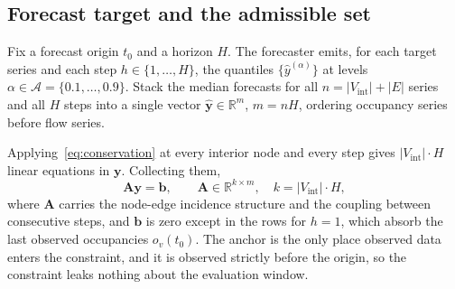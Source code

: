 \documentclass[11pt]{article}
\theoremstyle{plain}
\theoremstyle{definition}
\theoremstyle{remark}
\newcommand{\bA}{\bm{A}}
\newcommand{\by}{\bm{y}}
\newcommand{\bb}{\bm{b}}
\newcommand{\yhat}{\hat{\by}}
\newcommand{\Rb}{\mathbb{R}}
\begin{document}
\subsection{Forecast target and the admissible set}

Fix a forecast origin $t_0$ and a horizon $H$. The forecaster emits, for each target series and each step $h \in \{1,\dots,H\}$, the quantiles $\{\hat{y}^{(\alpha)}\}$ at levels $\alpha \in \mathcal{A} = \{0.1,\dots,0.9\}$. Stack the median forecasts for all $n = |V_{\mathrm{int}}| + |E|$ series and all $H$ steps into a single vector $\yhat \in \Rb^{m}$, $m = nH$, ordering occupancy series before flow series.

Applying~\eqref{eq:conservation} at every interior node and every step gives $|V_{\mathrm{int}}|\cdot H$ linear equations in $\by$. Collecting them,
\begin{equation}
\bA \by = \bb,
\qquad
\bA \in \Rb^{k \times m},\quad k = |V_{\mathrm{int}}| \cdot H,
\label{eq:system}
\end{equation}
where $\bA$ carries the node-edge incidence structure and the coupling between consecutive steps, and $\bb$ is zero except in the rows for $h=1$, which absorb the last observed occupancies $o_v(t_0)$. The anchor is the only place observed data enters the constraint, and it is observed strictly before the origin, so the constraint leaks nothing about the evaluation window.
\end{document}
